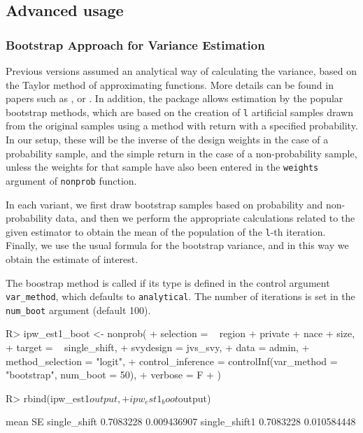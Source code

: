 \documentclass[
]{jss}
\begin{document}
\subsection{Advanced usage}\label{advanced-usage}

\subsubsection{Bootstrap Approach for Variance
Estimation}\label{bootstrap-approach-for-variance-estimation}

Previous versions assumed an analytical way of calculating the variance,
based on the Taylor method of approximating functions. More details can
be found in papers such as \cite{chen2020doubly},
\cite{yang_asymptotic_2020} or \cite{yang2021integration}. In addition,
the package allows estimation by the popular bootstrap methods, which
are based on the creation of \texttt{l} artificial samples drawn from
the original samples using a method with return with a specified
probability. In our setup, these will be the inverse of the design
weights in the case of a probability sample, and the simple return in
the case of a non-probability sample, unless the weights for that sample
have also been entered in the \texttt{weights} argument of
\texttt{nonprob} function.

In each variant, we first draw bootstrap samples based on probability
and non-probability data, and then we perform the appropriate
calculations related to the given estimator to obtain the mean of the
population of the \texttt{l}-th iteration. Finally, we use the usual
formula for the bootstrap variance, and in this way we obtain the
estimate of interest.

The boostrap method is called if its type is defined in the control
argument \texttt{var\_method}, which defaults to \texttt{analytical}.
The number of iterations is set in the \texttt{num\_boot} argument
(default 100).

\begin{CodeChunk}
\begin{CodeInput}
R> ipw_est1_boot <- nonprob(
+   selection = ~ region + private + nace + size,
+   target = ~ single_shift,
+   svydesign = jvs_svy,
+   data = admin,
+   method_selection = "logit",
+   control_inference = controlInf(var_method = "bootstrap", num_boot = 50),
+   verbose = F
+ )
\end{CodeInput}
\end{CodeChunk}

\begin{CodeChunk}
\begin{CodeInput}
R> rbind(ipw_est1$output,
+       ipw_est1_boot$output)
\end{CodeInput}
\begin{CodeOutput}
                   mean          SE
single_shift  0.7083228 0.009436907
single_shift1 0.7083228 0.010584448
\end{CodeOutput}
\end{CodeChunk}
\end{document}
